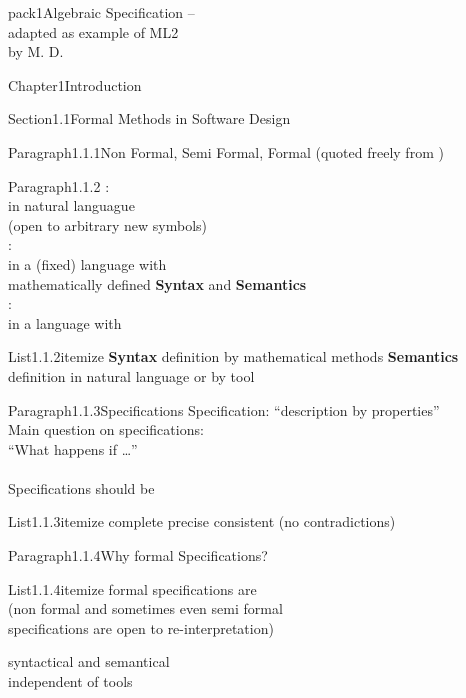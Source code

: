 \documentclass[landscape, slides, light]{mmiss2}
\begin{document}
\begin{Package}{pack1}{Algebraic
Specification -- \\ adapted as example of ML2\\ by M. D.}
\begin{Section}{Chapter1}{Introduction}
\begin{Section}{Section1.1}{Formal Methods in Software Design}{}
\begin{Paragraph}{Paragraph1.1.1}{Non Formal, Semi Formal, Formal}{}
(quoted freely from \cite{bowen99})
\end{Paragraph}
\begin{Paragraph}{Paragraph1.1.2}{}{}
:\\
in natural languague \\
(open to arbitrary new symbols)\\
\newline
{}: \\
in a (fixed) language with \\
mathematically defined {\bf Syntax} and {\bf Semantics}\\

: \\
in a language with
\begin{List}{List1.1.2}{itemize}{}
\ListItem{}
 {{\bf Syntax} definition by mathematical methods}
\ListItem{} 
{{\bf Semantics} definition in natural language or by tool}
\end{List}
\end{Paragraph}

\begin{Paragraph}{Paragraph1.1.3}{Specifications}{}
Specification: ``description by properties''\\

Main question on specifications:\\
``What happens if \dots'' \\ \\

Specifications should be \pause
\begin{List}{List1.1.3}{itemize}{}
\ListItem{}
{complete \pause}
\ListItem{}
{precise \pause}
\ListItem{}
{consistent (no contradictions)}
\end{List}
\end{Paragraph}
\begin{Paragraph}{Paragraph1.1.4}{Why formal Specifications?}{}
\begin{List}{List1.1.4}{itemize}{}
\ListItem{}
{formal specifications are   \\
          (non formal and sometimes even semi formal \\
          specifications are open to re-interpretation)\pause}


\ListItem{}
{syntactical and semantical  \\
          independent of tools \pause}


\end{List}
\end{Paragraph}
\end{Section}
\end{Section}
\end{Package}
\end{document}
